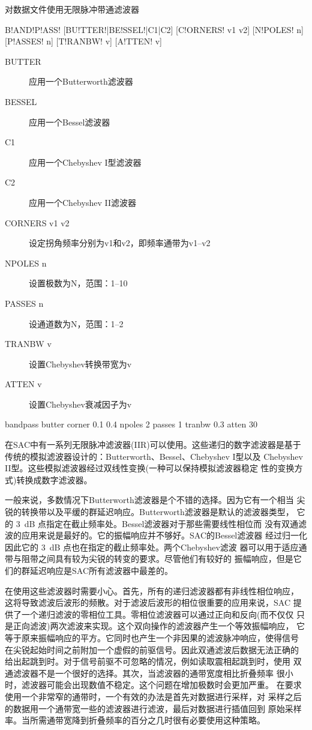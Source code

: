 \label{cmd:bandpass}

对数据文件使用无限脉冲带通滤波器

\begin{SACSTX}
B!AND!P!ASS! [BU!TTER!|BE!SSEL!|C1|C2] [C!ORNERS! v1 v2] [N!POLES! n] [P!ASSES! n]
    [T!RANBW! v] [A!TTEN! v]
\end{SACSTX}

\begin{description}
\item [BUTTER] 应用一个Butterworth滤波器
\item [BESSEL] 应用一个Bessel滤波器
\item [C1] 应用一个Chebyshev I型滤波器
\item [C2] 应用一个Chebyshev II滤波器
\item [CORNERS v1 v2] 设定拐角频率分别为v1和v2，即频率通带为v1--v2
\item [NPOLES n] 设置极数为N，范围：1--10
\item [PASSES n] 设通道数为N，范围：1--2
\item [TRANBW v] 设置Chebyshev转换带宽为v
\item [ATTEN v] 设置Chebyshev衰减因子为v
\end{description}

\begin{SACDFT}
bandpass butter corner 0.1 0.4 npoles 2 passes 1 tranbw 0.3 atten 30
\end{SACDFT}

在SAC中有一系列无限脉冲滤波器(IIR)可以使用。这些递归的数字滤波器是基于
传统的模拟滤波器设计的：Butterworth、Bessel、Chebyshev I型以及
Chebyshev II型。这些模拟滤波器经过双线性变换(一种可以保持模拟滤波器稳定
性的变换方式)转换成数字滤波器。

一般来说，多数情况下Butterworth滤波器是个不错的选择。因为它有一个相当
尖锐的转换带以及平缓的群延迟响应。Butterworth滤波器是默认的滤波器类型，
它的 \SI{3}{dB} 点指定在截止频率处。Bessel滤波器对于那些需要线性相位而
没有双通滤波的应用来说是最好的。它的振幅响应并不够好。SAC的Bessel滤波器
经过归一化因此它的 \SI{3}{\dB} 点也在指定的截止频率处。两个Chebyshev滤波
器可以用于适应通带与阻带之间具有较为尖锐的转变的要求。尽管他们有较好的
振幅响应，但是它们的群延迟响应是SAC所有滤波器中最差的。

在使用这些滤波器时需要小心。首先，所有的递归滤波器都有非线性相位响应，
这将导致滤波后波形的频散。对于滤波后波形的相位很重要的应用来说，SAC
提供了一个递归滤波的零相位工具。零相位滤波器可以通过正向和反向(而不仅仅
只是正向滤波)两次滤波来实现。这个双向操作的滤波器产生一个等效振幅响应，
它等于原来振幅响应的平方。它同时也产生一个非因果的滤波脉冲响应，使得信号
在尖锐起始时间之前附加一个虚假的前驱信号。因此双通滤波后数据无法正确的
给出起跳到时。对于信号前驱不可忽略的情况，例如读取震相起跳到时，使用
双通滤波器不是一个很好的选择。其次，当滤波器的通带宽度相比折叠频率
很小时，滤波器可能会出现数值不稳定。这个问题在增加极数时会更加严重。
在要求使用一个非常窄的通带时，一个有效的办法是首先对数据进行采样，对
采样之后的数据用一个通带宽一些的滤波器进行滤波，最后对数据进行插值回到
原始采样率。当所需通带宽降到折叠频率的百分之几时很有必要使用这种策略。

